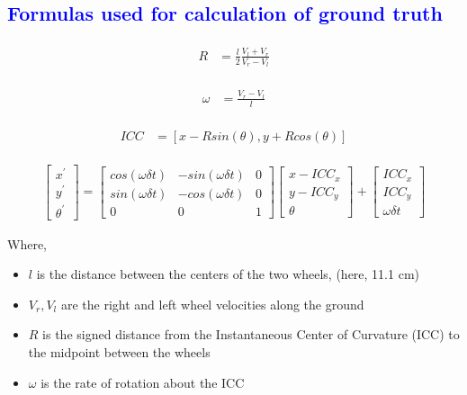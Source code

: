 \subsection{\textcolor{blue}{Formulas used for calculation of ground truth}}

\begin{align} 
\begin{split}
R 	&= \frac{l}{2} \frac{V_l + V_r}{V_r - V_l}
\end{split}					
\end{align}

\begin{align} 
\begin{split}
\omega 	&= \frac{V_r - V_l}{l}
\end{split}					
\end{align}

\begin{align} 
\begin{split}
ICC 	&= [x - R sin(\theta), y + R cos(\theta)]
\end{split}					
\end{align}


\begin{align}
\begin{bmatrix}
x^{'} \\
y^{'} \\
\theta^{'}
\end{bmatrix}
= 
\begin{bmatrix}
cos(\omega \delta t) & -sin(\omega \delta t) & 0\\
sin(\omega \delta t) & -cos(\omega \delta t) & 0\\
0 & 0 & 1
\end{bmatrix}
\begin{bmatrix}
x - ICC_x\\
y - ICC_y \\
\theta
\end{bmatrix}
+
\begin{bmatrix}
ICC_x\\
ICC_y \\
\omega \delta t
\end{bmatrix}
\end{align}

Where,
\begin{itemize}
	\item $l$ is the distance between the centers of the two wheels, (here, 11.1 cm)
	\item $V_r, V_l$ are the right and left wheel velocities along the ground
	\item $R$ is the signed distance from the Instantaneous Center of Curvature (ICC) to the midpoint between the wheels
	\item $\omega$ is the rate of rotation about the ICC
\end{itemize}
